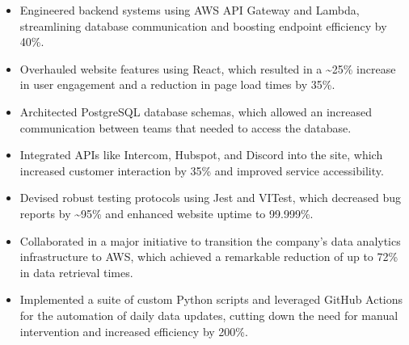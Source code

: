 \documentclass[10pt,a4paper,ragged2e,withhyper]{altacv}
\begin{document}

    \makecvheader
    \begin{paracol}{2}
            \begin{itemize}
                \item Engineered backend systems using AWS API Gateway and Lambda, streamlining database communication and boosting endpoint efficiency by 40\%.
                \item Overhauled website features using React, which resulted in a \textasciitilde25\% increase in user engagement and a reduction in page load times by 35\%.
                \item Architected PostgreSQL database schemas, which allowed an increased communication between teams that needed to access the database.
                \item Integrated APIs like Intercom, Hubspot, and Discord into the site, which increased customer interaction by 35\% and improved service accessibility.
                \item Devised robust testing protocols using Jest and VITest, which decreased bug reports by \textasciitilde95\% and enhanced website uptime to 99.999\%.
                \item Collaborated in a major initiative to transition the company's data analytics infrastructure to AWS, which achieved a remarkable reduction of up to 72\% in data retrieval times.
                \item Implemented a suite of custom Python scripts and leveraged GitHub Actions for the automation of daily data updates, cutting down the need for manual intervention and increased efficiency by 200\%.
            \end{itemize}
            \customdivider
            

\end{paracol}
\end{document}
